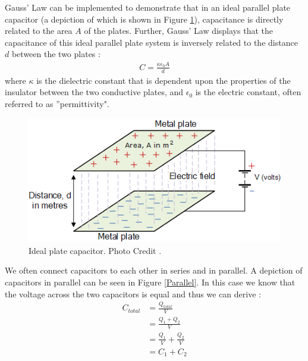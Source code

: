 \documentclass[oneside,12pt]{amsart}
\begin{document}
	\indent Gauss' Law can be implemented to demonstrate that in an ideal parallel plate capacitor (a depiction of which is shown in Figure \ref{Ideal}), capacitance is directly related to the area $A$ of the plates. Further, Gauss' Law displays that the capacitance of this ideal parallel plate system is inversely related to the distance $d$ between the two plates \cite{parallel}: 
	\begin{align*}
		C = \frac{\kappa \epsilon _{0}A}{d}
	\end{align*}
	where  $\kappa$ is the dielectric constant that is dependent upon the properties of the insulator between the two conductive plates, and $\epsilon_0$ is the electric constant, often referred to as ''permittivity".\\
	\begin{figure}[H]
		\includegraphics[width=\smallgraph,scale=0.01]{IdealCapacitor.png}
		\caption{Ideal plate capacitor. Photo Credit \cite{ideal}.}
		\label{Ideal}
	\end{figure}

	\indent We often connect capacitors to each other in series and in parallel. A depiction of capacitors in parallel can be seen in Figure \ref{Parallel}. In this case we know that the voltage across the two capacitors is equal\cite{cap} and thus we can derive :
	\begin{align*}
	C_{total} &= \frac{Q_{total}}{V} \\
	&=\frac{Q_1+Q_2}{V}\\
	&= \frac{Q_1}{V} + \frac{Q_2}{V}\\
	&= C_1 + C_2
	\end{align*}
	 
\end{document}
